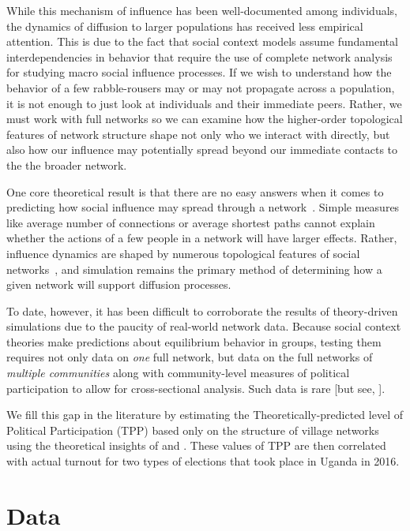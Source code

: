 \documentclass[12pt]{article}
\begin{document}
While this mechanism of influence has been well-documented among individuals, the dynamics of diffusion to larger populations has received less empirical attention. This is due to the fact that social context models assume fundamental interdependencies in behavior that require the use of complete network analysis for studying macro social influence processes. If we wish to understand how the behavior of a few rabble-rousers may or may not propagate across a population, it is not enough to just look at individuals and their immediate peers. Rather, we must work with full networks so we can examine how the higher-order topological features of network structure shape not only who we interact with directly, but also how our influence may potentially spread beyond our immediate contacts to the the broader network.

One core theoretical result is that there are no easy answers when it comes to predicting how social influence may spread through a network~\citep{centola2007complex,jackson2010diffusion}. Simple measures like average number of connections or average shortest paths cannot explain whether the actions of a few people in a network will have larger effects. Rather, influence dynamics are shaped by numerous topological features of social networks~\citep{centola2015social}, and simulation remains the primary method of determining how a given network will support diffusion processes.

To date, however, it has been difficult to corroborate the results of theory-driven simulations due to the paucity of real-world network data. Because social context theories make predictions about equilibrium behavior in groups, testing them requires not only data on \emph{one} full network, but data on the full networks of \emph{multiple communities} along with community-level measures of political participation to allow for cross-sectional analysis. Such data is rare [but see, \citet{cruz2017politician}].

We fill this gap in the literature by estimating the Theoretically-predicted level of Political Participation (TPP) based only on the structure of village networks using the theoretical insights of \cite{Siegel:2009vi} and \cite{Rolfe:2012ka}. These values of TPP are then correlated with actual turnout for two types of elections that took place in Uganda in 2016.


\section{Data}\label{section_data}
\end{document}
